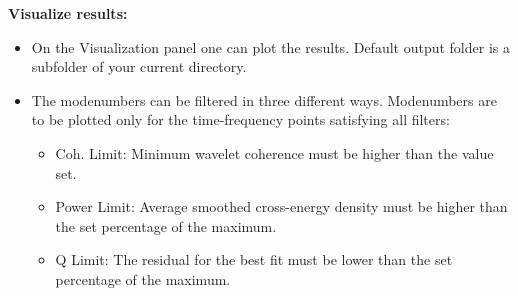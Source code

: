 \documentclass[12pt]{article}
\begin{document}
\vspace{-0.3 cm}\noindent\textbf{Visualize results:}\vspace{-0.3 cm}
\begin{itemize}
\setlength{\itemsep}{-4pt}
 \item On the Visualization panel one can plot the results. Default output folder is a subfolder of your current directory.
 \item The modenumbers can be filtered in three different ways. Modenumbers are to be plotted only for the time-frequency points satisfying all filters:
  \vspace{-0.3 cm}\begin{itemize}
  \setlength{\itemsep}{-4pt}
    \item Coh. Limit: Minimum wavelet coherence must be higher than the value set.
    \item Power Limit: Average smoothed cross-energy density must be higher than the set percentage of the maximum.
    \item Q Limit: The residual for the best fit must be lower than the set percentage of the maximum.
  \end{itemize}
\end{itemize}
\end{document}
